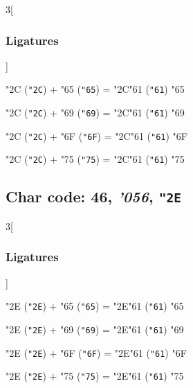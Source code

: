 \documentclass{article}
\newlength{\maxcharwidth}
\begin{document}
\begin{multicols}{3}[\subsubsection{Ligatures}]

{\testfont\char"2C\noboundary} ({\tt"2C}) + {\testfont\char"65\noboundary} ({\tt"65}) = {\testfont\char"2C\noboundary}{\testfont\char"61\noboundary} ({\tt"61}) {\testfont\char"65\noboundary}

{\testfont\char"2C\noboundary} ({\tt"2C}) + {\testfont\char"69\noboundary} ({\tt"69}) = {\testfont\char"2C\noboundary}{\testfont\char"61\noboundary} ({\tt"61}) {\testfont\char"69\noboundary}

{\testfont\char"2C\noboundary} ({\tt"2C}) + {\testfont\char"6F\noboundary} ({\tt"6F}) = {\testfont\char"2C\noboundary}{\testfont\char"61\noboundary} ({\tt"61}) {\testfont\char"6F\noboundary}

{\testfont\char"2C\noboundary} ({\tt"2C}) + {\testfont\char"75\noboundary} ({\tt"75}) = {\testfont\char"2C\noboundary}{\testfont\char"61\noboundary} ({\tt"61}) {\testfont\char"75\noboundary}

\end{multicols}

\subsection{Char code: 46, {\it'056}, {\tt"2E}}
\label{char_46}


\begin{multicols}{3}[\subsubsection{Ligatures}]

{\testfont\char"2E\noboundary} ({\tt"2E}) + {\testfont\char"65\noboundary} ({\tt"65}) = {\testfont\char"2E\noboundary}{\testfont\char"61\noboundary} ({\tt"61}) {\testfont\char"65\noboundary}

{\testfont\char"2E\noboundary} ({\tt"2E}) + {\testfont\char"69\noboundary} ({\tt"69}) = {\testfont\char"2E\noboundary}{\testfont\char"61\noboundary} ({\tt"61}) {\testfont\char"69\noboundary}

{\testfont\char"2E\noboundary} ({\tt"2E}) + {\testfont\char"6F\noboundary} ({\tt"6F}) = {\testfont\char"2E\noboundary}{\testfont\char"61\noboundary} ({\tt"61}) {\testfont\char"6F\noboundary}

{\testfont\char"2E\noboundary} ({\tt"2E}) + {\testfont\char"75\noboundary} ({\tt"75}) = {\testfont\char"2E\noboundary}{\testfont\char"61\noboundary} ({\tt"61}) {\testfont\char"75\noboundary}

\end{multicols}
\end{document}

